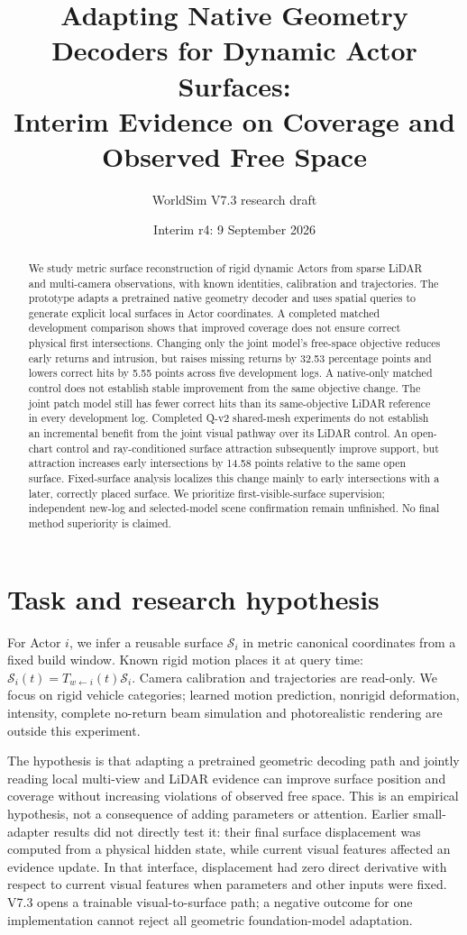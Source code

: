 \documentclass[10pt,a4paper]{article}
\title{Adapting Native Geometry Decoders for Dynamic Actor Surfaces:\\
Interim Evidence on Coverage and Observed Free Space}
\author{WorldSim V7.3 research draft}
\date{Interim r4: 9 September 2026}
\begin{document}
\maketitle
\begin{abstract}
We study metric surface reconstruction of rigid dynamic Actors from sparse
LiDAR and multi-camera observations, with known identities, calibration and
trajectories. The prototype adapts a pretrained native geometry decoder and
uses spatial queries to generate explicit local surfaces in Actor coordinates.
A completed matched development comparison shows that improved coverage does
not ensure correct physical first intersections. Changing only the joint
model's free-space objective reduces early returns and intrusion, but raises
missing returns by 32.53 percentage points and lowers correct hits by 5.55
points across five development logs. A native-only matched control does not
establish stable improvement from the same objective change. The joint patch model
still has fewer correct hits than its same-objective LiDAR reference in every
development log. Completed Q-v2 shared-mesh experiments do not establish an
incremental benefit from the joint visual pathway over its LiDAR control.
An open-chart control and ray-conditioned surface attraction subsequently
improve support, but attraction increases early intersections by 14.58 points
relative to the same open surface. Fixed-surface analysis localizes this
change mainly to early intersections with a later, correctly placed surface.
We prioritize first-visible-surface supervision; independent new-log and
selected-model scene confirmation remain unfinished. No final method
superiority is claimed.
\end{abstract}

\section{Task and research hypothesis}
For Actor $i$, we infer a reusable surface $\mathcal S_i$ in metric canonical
coordinates from a fixed build window. Known rigid motion places it at query
time: $\mathcal S_i(t)=T_{w\leftarrow i}(t)\mathcal S_i$. Camera calibration and
trajectories are read-only. We focus on rigid vehicle categories; learned
motion prediction, nonrigid deformation, intensity, complete no-return beam
simulation and photorealistic rendering are outside this experiment.

The hypothesis is that adapting a pretrained geometric decoding path and
jointly reading local multi-view and LiDAR evidence can improve surface
position and coverage without increasing violations of observed free space.
This is an empirical hypothesis, not a consequence of adding parameters or
attention. Earlier small-adapter results did not directly test it: their final
surface displacement was computed from a physical hidden state, while current
visual features affected an evidence update. In that interface, displacement
had zero direct derivative with respect to current visual features when
parameters and other inputs were fixed. V7.3 opens a trainable visual-to-surface
path; a negative outcome for one implementation cannot reject all geometric
foundation-model adaptation.
\end{document}
